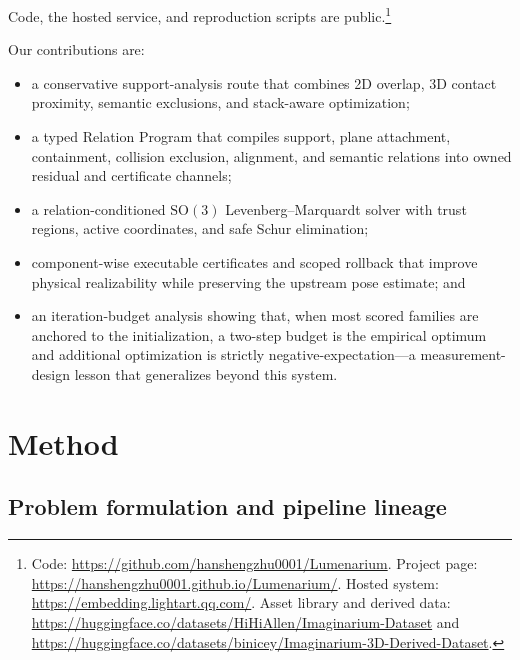 \documentclass[10pt,twocolumn]{article}
\begin{document}
Code, the hosted service, and reproduction scripts are public.\footnote{Code:
\url{https://github.com/hanshengzhu0001/Lumenarium}. Project page:
\url{https://hanshengzhu0001.github.io/Lumenarium/}. Hosted system:
\url{https://embedding.lightart.qq.com/}. Asset library and derived data:
\url{https://huggingface.co/datasets/HiHiAllen/Imaginarium-Dataset} and
\url{https://huggingface.co/datasets/binicey/Imaginarium-3D-Derived-Dataset}.}

Our contributions are:
\begin{itemize}
  \item a conservative support-analysis route that combines 2D overlap, 3D
  contact proximity, semantic exclusions, and stack-aware optimization;
  \item a typed Relation Program that compiles support, plane attachment,
  containment, collision exclusion, alignment, and semantic relations into
  owned residual and certificate channels;
  \item a relation-conditioned $\mathrm{SO}(3)$ Levenberg--Marquardt solver
  with trust regions, active coordinates, and safe Schur elimination;
  \item component-wise executable certificates and scoped rollback that
  improve physical realizability while preserving the upstream pose estimate;
  and
  \item an iteration-budget analysis showing that, when most scored families
  are anchored to the initialization, a two-step budget is the empirical
  optimum and additional optimization is strictly negative-expectation---a
  measurement-design lesson that generalizes beyond this system.
\end{itemize}

\section{Method}

\subsection{Problem formulation and pipeline lineage}
\end{document}
